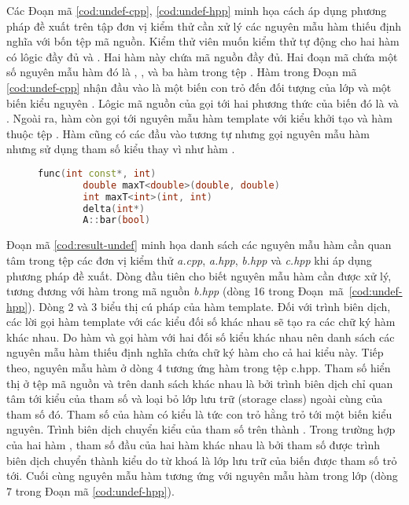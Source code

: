 Các Đoạn mã \autoref{cod:undef-cpp}, \autoref{cod:undef-hpp} minh họa cách áp dụng phương pháp đề xuất trên tập đơn vị kiểm thử cần xử lý các nguyên mẫu hàm thiếu định nghĩa với bốn tệp mã nguồn. Kiểm thử viên muốn kiểm thử tự động cho hai hàm có lôgic đầy đủ  và . Hai hàm này chứa mã nguồn đầy đủ. Hai đoạn mã chứa một số nguyên mẫu hàm đó là , ,  và ba hàm trong tệp . Hàm  trong Đoạn mã \autoref{cod:undef-cpp} nhận đầu vào là một biến con trỏ đến đối tượng của lớp  và một biến kiểu nguyên . Lôgic mã nguồn của  gọi tới hai phương thức của biến  đó là  và . Ngoài ra, hàm  còn gọi tới nguyên mẫu hàm template  với kiểu khởi tạo  và hàm  thuộc tệp . Hàm  cũng có các đầu vào tương tự nhưng gọi nguyên mẫu hàm  nhưng sử dụng tham số kiểu  thay vì  như hàm .
\vspace{5mm}
\begin{figure}[h]
	\begin{lstlisting}[language=C++, caption={Danh sách các nguyên mẫu hàm thiếu định nghĩa tìm bởi trình biên dịch.}, label={cod:result-undef}, captionpos=b]
		func(int const*, int)
		double maxT<double>(double, double)        
		int maxT<int>(int, int)     
		delta(int*)
		A::bar(bool)         
	\end{lstlisting}
\end{figure}

Đoạn mã \autoref{cod:result-undef} minh họa danh sách các nguyên mẫu hàm cần quan tâm trong tệp các đơn vị kiểm thử \textit{a.cpp}, \textit{a.hpp}, \textit{b.hpp} và \textit{c.hpp} khi áp dụng phương pháp đề xuất. Dòng đầu tiên cho biết nguyên mẫu hàm  cần được xử lý, tương đương với hàm  trong mã nguồn \textit{b.hpp} (dòng 16 trong Đoạn~mã~\autoref{cod:undef-hpp}). Dòng 2 và 3 biểu thị cú pháp của hàm template. Đối với trình biên dịch, các lời gọi hàm template với các kiểu đối số khác nhau sẽ tạo ra các chữ ký hàm khác nhau. Do hàm  và  gọi hàm  với hai đối số kiểu khác nhau nên danh sách các nguyên mẫu hàm thiếu định nghĩa chứa chữ ký hàm cho cả hai kiểu này. Tiếp theo, nguyên mẫu hàm ở dòng 4 tương ứng hàm  trong tệp c.hpp. Tham số hiển thị ở tệp mã nguồn và trên danh sách khác nhau là bởi trình biên dịch chỉ quan tâm tới kiểu của tham số và loại bỏ lớp lưu trữ (storage class) ngoài cùng của tham số đó. Tham số  của hàm  có kiểu là  tức con trỏ hằng trỏ tới một biến kiểu nguyên. Trình biên dịch chuyển kiểu của tham số trên thành . Trong trường hợp của hai hàm , tham số đầu của hai hàm khác nhau là bởi tham số  được trình biên dịch chuyển thành kiểu  do từ khoá  là lớp lưu trữ của biến được tham số trỏ tới. Cuối cùng nguyên mẫu hàm  tương ứng với nguyên mẫu hàm  trong lớp  (dòng 7 trong Đoạn mã \autoref{cod:undef-hpp}).

